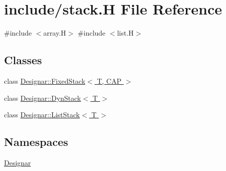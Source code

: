 \hypertarget{stack_8_h}{}\section{include/stack.H File Reference}
\label{stack_8_h}
{\ttfamily \#include $<$array.\+H$>$}\newline
{\ttfamily \#include $<$list.\+H$>$}\newline
\subsection*{Classes}
\begin{DoxyCompactItemize}
\item 
class \hyperlink{class_designar_1_1_fixed_stack}{Designar\+::\+Fixed\+Stack$<$ T, C\+A\+P $>$}
\item 
class \hyperlink{class_designar_1_1_dyn_stack}{Designar\+::\+Dyn\+Stack$<$ T $>$}
\item 
class \hyperlink{class_designar_1_1_list_stack}{Designar\+::\+List\+Stack$<$ T $>$}
\end{DoxyCompactItemize}
\subsection*{Namespaces}
\begin{DoxyCompactItemize}
\item 
 \hyperlink{namespace_designar}{Designar}
\end{DoxyCompactItemize}
